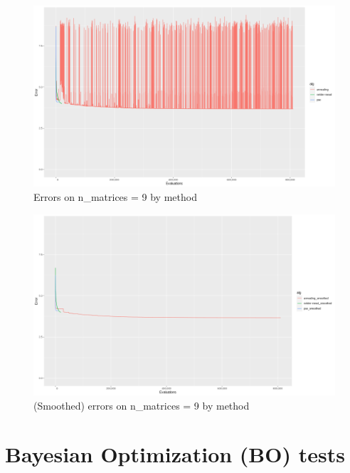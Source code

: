 \begin{figure}[!htb]
\centering
\includegraphics[width=\textwidth]{figures/n_9}
\decoRule
\caption[n=9]{Errors on n\_matrices = 9 by method}
\label{fig:n_9}
\end{figure}

\begin{figure}[!htb]
\centering
\includegraphics[width=\textwidth]{figures/n_9_smoothed}
\decoRule
\caption[n=9 (smoothed)]{(Smoothed) errors on n\_matrices = 9 by method}
\label{fig:n_9_smoothed}
\end{figure}



\section{Bayesian Optimization (BO) tests}

